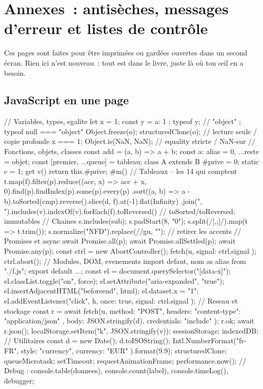 \documentclass[12pt,a4paper,twoside,openright]{book}
\begin{document}
\backmatter
\chapter*{Annexes~: antis\`eches, messages d'erreur et listes de contr\^ole}
\label{ch-antisecche}

Ces pages sont faites pour \^etre imprim\'ees ou gard\'ees ouvertes dans un second \'ecran.
Rien ici n'est nouveau~: tout est dans le livre, juste l\`a o\`u ton \oe{}il en a besoin.

\section{JavaScript en une page}

\begin{codejs}
// Variables, types, egalite
let x = 1; const y = { a: 1 }; typeof y;               // "object" ; typeof null === "object"
Object.freeze(o); structuredClone(o);                   // lecture seule / copie profonde
x === 1; Object.is(NaN, NaN);                           // equality stricte / NaN-sur
// Fonctions, objets, classes
const add = (a, b) => a + b;
const { a: alias = 0, ...reste } = objet;
const [premier, ...queue] = tableau;
class A extends B { #prive = 0; static c = 1; get v() { return this.#prive; } #m() { } }
// Tableaux -- les 14 qui comptent
t.map(f).filter(p).reduce((acc, x) => acc + x, 0).find(p).findIndex(p).some(p).every(p)
 .sort((a, b) => a - b).toSorted(cmp).reverse().slice(d, f).at(-1).flat(Infinity)
 .join(", ").includes(v).indexOf(v).forEach(f).toReversed()   // toSorted/toReversed: immutables
// Chaines
s.includes(sub); s.padStart(8, "0"); s.split(/[,;]/).map(t => t.trim());
s.normalize("NFD").replace(//gu, "");      // retirer les accents
// Promises et async
await Promise.all(p); await Promise.allSettled(p); await Promise.any(p);
const ctrl = new AbortController(); fetch(u, { signal: ctrl.signal }); ctrl.abort();
// Modules, DOM, evenements
import defaut, { nom as alias } from "./f.js"; export default ...;
const el = document.querySelector("[data-x]");
el.classList.toggle("on", force); el.setAttribute("aria-expanded", "true");
el.insertAdjacentHTML("beforeend", html); el.dataset.x = "1";
el.addEventListener("click", h, { once: true, signal: ctrl.signal });
// Reseau et stockage
const r = await fetch(u, { method: "POST", headers: { "content-type": "application/json" },
  body: JSON.stringify(d), credentials: "include" }); r.ok; await r.json();
localStorage.setItem("k", JSON.stringify(v)); sessionStorage; indexedDB;
// Utilitaires
const d = new Date(); d.toISOString(); Intl.NumberFormat("fr-FR", { style: "currency", currency: "EUR" }).format(9.9);
structuredClone; queueMicrotask; setTimeout; requestAnimationFrame; performance.now();
// Debug : console.table(donnees), console.count(label), console.timeLog(), debugger;
\end{codejs}
\end{document}
